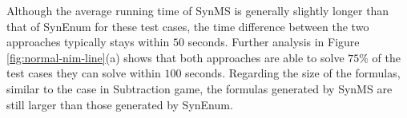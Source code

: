\documentclass[review]{elsarticle}
\begin{document}
Although the average running time of SynMS is generally slightly longer than that of SynEnum for these test cases, the time difference between the two approaches typically stays within $50$ seconds. Further analysis in Figure \ref{fig:normal-nim-line}(a) shows that both approaches are able to solve $75\%$ of the test cases they can solve within $100$ seconds. Regarding the size of the formulas, similar to the case in Subtraction game, the formulas generated by SynMS are still larger than those generated by SynEnum.
\end{document}
